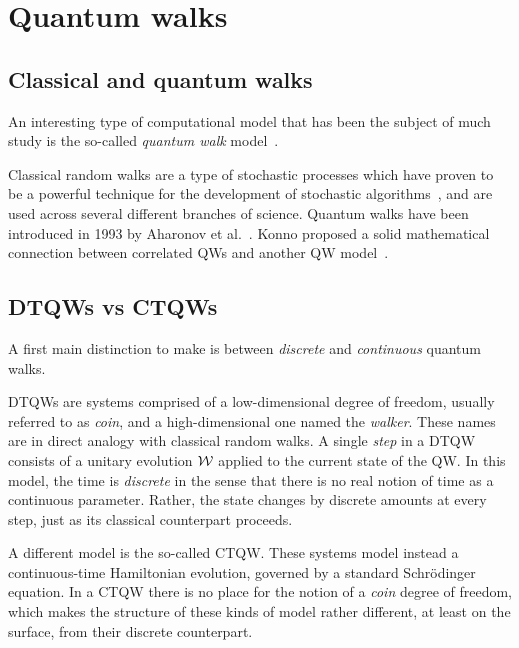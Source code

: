 \section{Quantum walks}

\subsection{Classical and quantum walks}

An interesting type of computational model that has been the subject of much study is the so-called \textit{quantum walk} model~\cite{aharonov2000quantum,venegas-andraca2012quantum,kempe2003quantum}.

Classical random walks are a type of stochastic processes which have proven to be a powerful technique for the development of stochastic algorithms~\cite{motwani1995randomized,schoning1999probabilistic}, and are used across several different branches of science.
Quantum walks have been introduced in 1993 by Aharonov et al.~\cite{aharonov1993quantum}.
Konno proposed a solid mathematical connection between correlated \acp{QW} and another QW model~\cite{konno2003limit}.

\subsection{DTQWs vs CTQWs}

A first main distinction to make is between \textit{discrete} and \textit{continuous} quantum walks.

DTQWs are systems comprised of a low-dimensional degree of freedom, usually referred to as \textit{coin}, and a high-dimensional one named the \textit{walker}.
These names are in direct analogy with classical random walks. A single \textit{step} in a DTQW consists of a unitary evolution $\mathcal{W}$ applied to the current state of the QW.
In this model, the time is \textit{discrete} in the sense that there is no real notion of time as a continuous parameter. Rather, the state changes by discrete amounts at every step, just as its classical counterpart proceeds.

A different model is the so-called CTQW. These systems model instead a continuous-time Hamiltonian evolution, governed by a standard Schr\"odinger equation. In a CTQW there is no place for the notion of a \textit{coin} degree of freedom, which makes the structure of these kinds of model rather different, at least on the surface, from their discrete counterpart.

